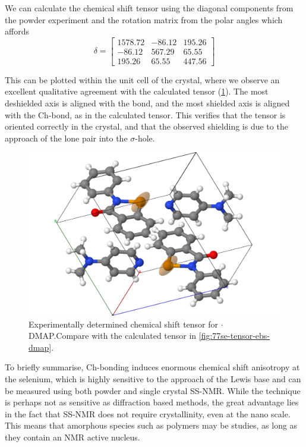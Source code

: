 \begin{refsection}
We can calculate the chemical shift tensor using the diagonal components from the powder experiment and the rotation matrix from the polar angles which affords
\begin{equation}
  \delta = \begin{bmatrix} 1578.72 & -86.12 & 195.26 \\ -86.12 & 567.29 & 65.55 \\ 195.26 & 65.55 & 447.56 \end{bmatrix}
\end{equation}

This can be plotted within the unit cell of the crystal, where we observe an excellent qualitative agreement with the calculated tensor (\cref{fig:expt-tensor-ebs-dmap}).
The most deshielded axis is aligned with the  bond, and the most shielded axis is aligned with the Ch-bond, as in the calculated tensor.
This verifies that the tensor is oriented correctly in the crystal, and that the observed shielding is due to the approach of the lone pair into the $ \sigma $-hole.

\begin{figure}
  \centering
  \includegraphics[width=0.7\linewidth]{Figures/expt-tensor-ebs-dmap.pdf}
  \caption[Experimentally determined chemical shift tensor for $ \cdot $DMAP.]{Experimentally determined chemical shift tensor for $ \cdot $DMAP.\@ Compare with the calculated tensor in \cref{fig:77se-tensor-ebs-dmap}.}\label{fig:expt-tensor-ebs-dmap}
\end{figure}

To briefly summarise, Ch-bonding induces enormous chemical shift anisotropy at the selenium, which is highly sensitive to the approach of the Lewis base and can be measured using both powder and single crystal SS-NMR.\@
While the technique is perhaps not as sensitive as diffraction based methods, the great advantage lies in the fact that SS-NMR does not require crystallinity, even at the nano scale.
This means that amorphous species such as polymers may be studies, as long as they contain an NMR active nucleus.


\end{refsection}
